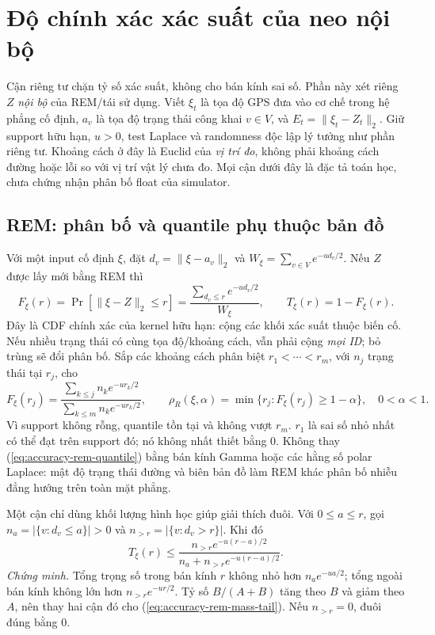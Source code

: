 \section{Độ chính xác xác suất của neo nội bộ}
\label{sec:formal-current-accuracy}

Cận riêng tư chặn tỷ số xác suất, không cho bán kính sai số. Phần này xét
riêng $Z$ \emph{nội bộ} của REM/tái sử dụng. Viết $\xi_t$ là tọa độ GPS
đưa vào cơ chế trong hệ phẳng cố định, $a_v$ là tọa độ trạng thái công khai
$v\in V$, và $E_t=\|\xi_t-Z_t\|_2$. Giữ support hữu hạn, $u>0$, test
Laplace và randomness độc lập lý tưởng như phần riêng tư. Khoảng cách ở
đây là Euclid của \emph{vị trí đo}, không phải khoảng cách đường hoặc lỗi
so với vị trí vật lý chưa đo. Mọi cận dưới đây là đặc tả toán học, chưa
chứng nhận phân bố float của simulator.

\subsection{REM: phân bố và quantile phụ thuộc bản đồ}
\label{sec:formal-rem-accuracy}

Với một input cố định $\xi$, đặt $d_v=\|\xi-a_v\|_2$ và
$W_\xi=\sum_{v\in V}e^{-ud_v/2}$. Nếu $Z$ được lấy mới bằng REM thì
\begin{equation}
 F_\xi(r)=\Pr[\|\xi-Z\|_2\leq r]
 =\frac{\sum_{d_v\leq r}e^{-ud_v/2}}{W_\xi},\qquad
 T_\xi(r)=1-F_\xi(r).
 \label{eq:accuracy-rem-cdf}
\end{equation}
Đây là CDF chính xác của kernel hữu hạn: cộng các khối xác suất thuộc
biến cố. Nếu nhiều trạng thái có cùng tọa độ/khoảng cách, vẫn phải cộng
\emph{mọi ID}; bỏ trùng sẽ đổi phân bố. Sắp các khoảng cách phân biệt
$r_1<\cdots<r_m$, với $n_j$ trạng thái tại $r_j$, cho
\begin{equation}
 F_\xi(r_j)=\frac{\sum_{k\leq j}n_ke^{-ur_k/2}}
                         {\sum_{k\leq m}n_ke^{-ur_k/2}},\qquad
 \rho_R(\xi,\alpha)=\min\{r_j:F_\xi(r_j)\geq1-\alpha\},
 \quad 0<\alpha<1.
 \label{eq:accuracy-rem-quantile}
\end{equation}
Vì support không rỗng, quantile tồn tại và không vượt $r_m$. $r_1$ là
sai số nhỏ nhất có thể đạt trên support đó; nó không nhất thiết bằng 0.
Không thay (\ref{eq:accuracy-rem-quantile}) bằng bán kính Gamma hoặc các
hằng số polar Laplace: mật độ trạng thái đường và biên bản đồ làm REM khác
phân bố nhiễu đẳng hướng trên toàn mặt phẳng.

Một cận chỉ dùng khối lượng hình học giúp giải thích đuôi. Với $0\leq a\leq r$,
gọi $n_a=|\{v:d_v\leq a\}|>0$ và $n_{>r}=|\{v:d_v>r\}|$. Khi đó
\begin{equation}
 T_\xi(r)\leq
 \frac{n_{>r}e^{-u(r-a)/2}}{n_a+n_{>r}e^{-u(r-a)/2}}.
 \label{eq:accuracy-rem-mass-tail}
\end{equation}
\emph{Chứng minh.} Tổng trọng số trong bán kính $r$ không nhỏ hơn
$n_ae^{-ua/2}$; tổng ngoài bán kính không lớn hơn $n_{>r}e^{-ur/2}$.
Tỷ số $B/(A+B)$ tăng theo $B$ và giảm theo $A$, nên thay hai cận đó cho
(\ref{eq:accuracy-rem-mass-tail}). Nếu $n_{>r}=0$, đuôi đúng bằng 0.


